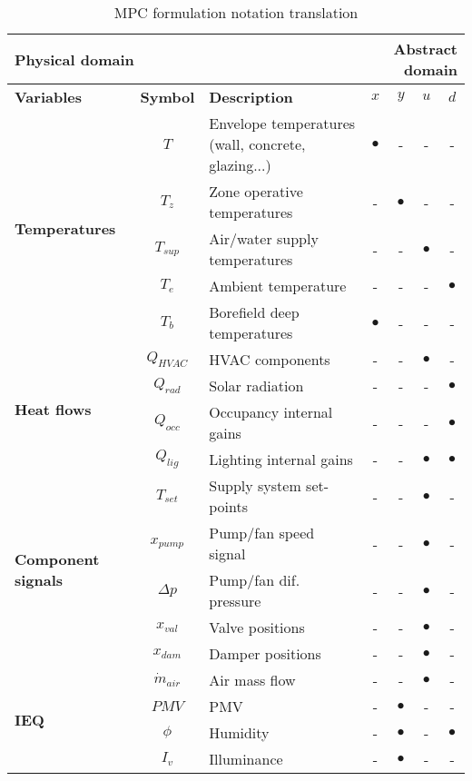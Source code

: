 \documentclass[10pt]{extarticle}
\begin{document}
\begin{table}[b]
\centering
\caption{MPC formulation notation translation}
\begin{tabular}{l|c|l|cccc}
\toprule
\multicolumn{3}{l}{\textbf{Physical domain}} & \multicolumn{4}{r}{\textbf{Abstract domain}} \\
\toprule
\textbf{Variables} & \textbf{Symbol} & \textbf{Description} & \textbf{$x$} & \textbf{$y$} & \textbf{$u$} & \textbf{$d$} \\ 
\midrule
\multirow{5}{*}{\textbf{Temperatures}} & $T$ & Envelope temperatures (wall, concrete, glazing...) & $\bullet$ & - & - & - \\ 
& $T_z$ & Zone operative temperatures & - & $\bullet$ & - & - \\
& $T_{sup}$ & Air/water supply temperatures &  - & - & $\bullet$ & - \\
& $T_e$ & Ambient temperature &  - & - & - & $\bullet$ \\
& $T_b$ & Borefield deep temperatures & $\bullet$ & - & - & - \\
\midrule
\multirow{4}{*}{\textbf{Heat flows}} &
$Q_{HVAC}$ & HVAC components & - & - & $\bullet$ & - \\
& $Q_{rad}$ & Solar radiation & - & - & - & $\bullet$ \\
& $Q_{occ}$ & Occupancy internal gains & - & - & - & $\bullet$ \\
& $Q_{lig}$ & Lighting internal gains & - & - & $\bullet$ & $\bullet$ \\
\midrule
\multirow{5}{*}{\textbf{Component signals}} &
$T_{set}$ & Supply system set-points & - & - & $\bullet$ & - \\
& $x_{pump}$ & Pump/fan speed signal & - & - & $\bullet$ & - \\
& $\Delta p$ & Pump/fan dif. pressure & - & - & $\bullet$ & - \\
& $x_{val}$ & Valve positions & - & - & $\bullet$ & - \\
& $x_{dam}$ & Damper positions & - & - & $\bullet$ & - \\
\midrule
\multirow{4}{*}{\textbf{IEQ}} &
$\dot{m}_{air}$ & Air mass flow & - & - & $\bullet$ & - \\
& $PMV$ & PMV & - & $\bullet$ & - & - \\
& $\phi$ & Humidity & - & $\bullet$ & - & $\bullet$ \\
& $I_v$ & Illuminance & - & $\bullet$ & - & - \\
\bottomrule 
\end{tabular}
\end{table} 
\end{document}
